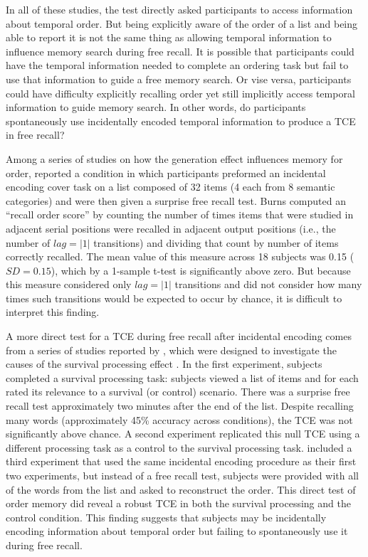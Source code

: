 \documentclass[man,natbib,floatsintext]{apa6} %
\begin{document}
\label{TODO-4}
In all of these studies, the test directly asked participants to access information about temporal order. But being explicitly aware of the order of a list and being able to report it is not the same thing as allowing temporal information to influence memory search during free recall. It is possible that participants could have the temporal information needed to complete an ordering task but fail to use that information to guide a free memory search. Or vise versa, participants could have difficulty explicitly recalling order yet still implicitly access temporal information to guide memory search. In other words, do participants spontaneously use incidentally encoded temporal information to produce a TCE in free recall? 

Among a series of studies on how the generation effect influences memory for order, \citet{Burn96} reported a condition in which participants preformed an incidental encoding cover task on a list composed of 32 items (4 each from 8 semantic categories) and were then given a surprise free recall test. Burns computed an ``recall order score'' by counting the number of times items that were studied in adjacent serial positions were recalled in adjacent output positions (i.e., the number of $lag=|1|$ transitions) and dividing that count by number of items correctly recalled.  The mean value of this measure across 18 subjects was 0.15 ($SD = 0.15$), which by a 1-sample t-test is significantly above zero. But because this measure considered only $lag=|1|$ transitions and did not consider how many times such transitions would be expected to occur by chance, it is difficult to interpret this finding. 


A more direct test for a TCE during free recall after incidental encoding comes from a series of studies reported by \citet{NairEtal17}, which were designed to investigate the causes of the survival processing effect \citep{NairEtal07}. In the first experiment, subjects completed a survival processing task: subjects viewed a list of items and for each rated its relevance to a survival (or control) scenario. There was a surprise free recall test approximately two minutes after the end of the list. Despite recalling many words (approximately 45\% accuracy across conditions), the TCE was not significantly above chance. A second experiment replicated this null TCE using a different processing task as a control to the survival processing task. \citet{NairEtal17} included a third experiment that used the same incidental encoding procedure as their first two experiments, but instead of a free recall test, subjects were provided with all of the words from the list and asked to reconstruct the order. This direct test of order memory did reveal a robust TCE in both the survival processing and the control condition. This finding suggests that subjects may be incidentally encoding information about temporal order but failing to spontaneously use it during free recall.
\end{document}
